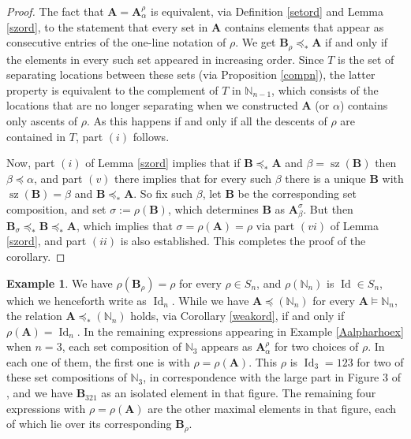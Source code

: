 \documentclass{article}
\theoremstyle{definition}
\newtheorem{ex}[thm]{Example}
\begin{document}
\begin{proof}
The fact that $\mathbf{A}=\mathbf{A}_{\alpha}^{\rho}$ is equivalent, via Definition \ref{setord} and Lemma \ref{szord}, to the statement that every set in $\mathbf{A}$ contains elements that appear as consecutive entries of the one-line notation of $\rho$. We get $\mathbf{B}_{\rho}\preceq_{*}\mathbf{A}$ if and only if the elements in every such set appeared in increasing order. Since $T$ is the set of separating locations between these sets (via Proposition \ref{compn}), the latter property is equivalent to the complement of $T$ in $\mathbb{N}_{n-1}$, which consists of the locations that are no longer separating when we constructed $\mathbf{A}$ (or $\alpha$) contains only ascents of $\rho$. As this happens if and only if all the descents of $\rho$ are contained in $T$, part $(i)$ follows.

Now, part $(i)$ of Lemma \ref{szord} implies that if $\mathbf{B}\preceq_{*}\mathbf{A}$ and $\beta=\operatorname{sz}(\mathbf{B})$ then $\beta\preceq\alpha$, and part $(v)$ there implies that for every such $\beta$ there is a unique $\mathbf{B}$ with $\operatorname{sz}(\mathbf{B})=\beta$ and $\mathbf{B}\preceq_{*}\mathbf{A}$. So fix such $\beta$, let $\mathbf{B}$ be the corresponding set composition, and set $\sigma:=\rho(\mathbf{B})$, which determines $\mathbf{B}$ as $\mathbf{A}_{\beta}^{\sigma}$. But then $\mathbf{B}_{\sigma}\preceq_{*}\mathbf{B}\preceq_{*}\mathbf{A}$, which implies that $\sigma=\rho(\mathbf{A})=\rho$ via part $(vi)$ of Lemma \ref{szord}, and part $(ii)$ is also established. This completes the proof of the corollary.
\end{proof}

\begin{ex}
We have $\rho(\mathbf{B}_{\rho})=\rho$ for every $\rho \in S_{n}$, and $\rho(\mathbb{N}_{n})$ is $\operatorname{Id} \in S_{n}$, which we henceforth write as $\operatorname{Id}_{n}$. While we have $\mathbf{A}\preceq(\mathbb{N}_{n})$ for every $\mathbf{A}\vDash\mathbb{N}_{n}$, the relation $\mathbf{A}\preceq_{*}(\mathbb{N}_{n})$ holds, via Corollary \ref{weakord}, if and only if $\rho(\mathbf{A})=\operatorname{Id}_{n}$. In the remaining expressions appearing in Example \ref{Aalpharhoex} when $n=3$, each set composition of $\mathbb{N}_{3}$ appears as $\mathbf{A}_{\alpha}^{\rho}$ for two choices of $\rho$. In each one of them, the first one is with $\rho=\rho(\mathbf{A})$. This $\rho$ is $\operatorname{Id}_{3}=123$ for two of these set compositions of $\mathbb{N}_{3}$, in correspondence with the large part in Figure 3 of \cite{[BZ]}, and we have $\mathbf{B}_{321}$ as an isolated element in that figure. The remaining four expressions with $\rho=\rho(\mathbf{A})$ are the other maximal elements in that figure, each of which lie over its corresponding $\mathbf{B}_{\rho}$. \label{rhoAex}
\end{ex}
\end{document}
